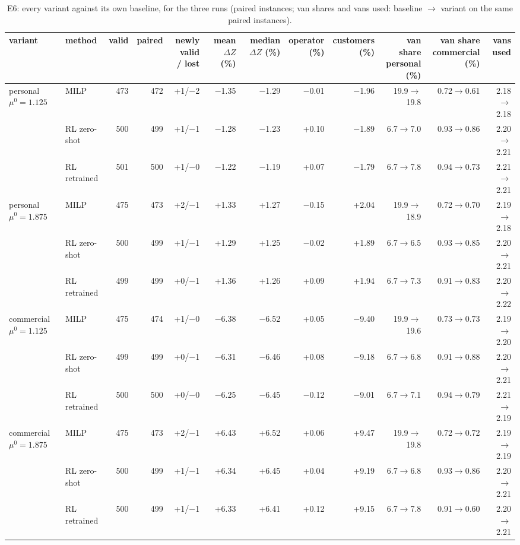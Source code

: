 \begin{table}[H]\centering
\scriptsize
\caption{E6: every variant against its own baseline, for the three runs (paired instances; van shares and vans used: baseline $\to$ variant on the same paired instances).}\label{tab:expE6}
\begin{adjustbox}{max width=\textwidth}\begin{tabular}{llrrrrrrrrrr}\toprule
variant & method & valid & paired & \shortstack{newly valid\\/ lost} & \shortstack{mean\\$\Delta Z$ (\%)} & \shortstack{median\\$\Delta Z$ (\%)} & \shortstack{operator\\(\%)} & \shortstack{customers\\(\%)} & \shortstack{van share\\personal (\%)} & \shortstack{van share\\commercial (\%)} & vans used \\ \midrule
personal $\mu^{0}=1.125$ & MILP & 473 & 472 & +1/$-$2 & $-$1.35 & $-$1.29 & $-$0.01 & $-$1.96 & 19.9$\to$19.8 & 0.72$\to$0.61 & 2.18$\to$2.18 \\
 & RL zero-shot & 500 & 499 & +1/$-$1 & $-$1.28 & $-$1.23 & +0.10 & $-$1.89 & 6.7$\to$7.0 & 0.93$\to$0.86 & 2.20$\to$2.21 \\
 & RL retrained & 501 & 500 & +1/$-$0 & $-$1.22 & $-$1.19 & +0.07 & $-$1.79 & 6.7$\to$7.8 & 0.94$\to$0.73 & 2.21$\to$2.21 \\
personal $\mu^{0}=1.875$ & MILP & 475 & 473 & +2/$-$1 & +1.33 & +1.27 & $-$0.15 & +2.04 & 19.9$\to$18.9 & 0.72$\to$0.70 & 2.19$\to$2.18 \\
 & RL zero-shot & 500 & 499 & +1/$-$1 & +1.29 & +1.25 & $-$0.02 & +1.89 & 6.7$\to$6.5 & 0.93$\to$0.85 & 2.20$\to$2.21 \\
 & RL retrained & 499 & 499 & +0/$-$1 & +1.36 & +1.26 & +0.09 & +1.94 & 6.7$\to$7.3 & 0.91$\to$0.83 & 2.20$\to$2.22 \\
commercial $\mu^{0}=1.125$ & MILP & 475 & 474 & +1/$-$0 & $-$6.38 & $-$6.52 & +0.05 & $-$9.40 & 19.9$\to$19.6 & 0.73$\to$0.73 & 2.19$\to$2.20 \\
 & RL zero-shot & 499 & 499 & +0/$-$1 & $-$6.31 & $-$6.46 & +0.08 & $-$9.18 & 6.7$\to$6.8 & 0.91$\to$0.88 & 2.20$\to$2.21 \\
 & RL retrained & 500 & 500 & +0/$-$0 & $-$6.25 & $-$6.45 & $-$0.12 & $-$9.01 & 6.7$\to$7.1 & 0.94$\to$0.79 & 2.21$\to$2.19 \\
commercial $\mu^{0}=1.875$ & MILP & 475 & 473 & +2/$-$1 & +6.43 & +6.52 & +0.06 & +9.47 & 19.9$\to$19.8 & 0.72$\to$0.72 & 2.19$\to$2.19 \\
 & RL zero-shot & 500 & 499 & +1/$-$1 & +6.34 & +6.45 & +0.04 & +9.19 & 6.7$\to$6.8 & 0.93$\to$0.86 & 2.20$\to$2.21 \\
 & RL retrained & 500 & 499 & +1/$-$1 & +6.33 & +6.41 & +0.12 & +9.15 & 6.7$\to$7.8 & 0.91$\to$0.60 & 2.20$\to$2.21 \\
\bottomrule\end{tabular}\end{adjustbox}\end{table}
